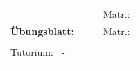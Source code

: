 \documentclass[a4paper,9pt, DIV15]{scrartcl} %
\newcommand{\LectureTitle}{}
\newcommand{\UBNR}{}
\newcommand{\AuthorOneName}{}
\newcommand{\AuthorOneMatr}{}
\newcommand{\AuthorTwoName}{}
\newcommand{\AuthorTwoMatr}{}
\newcommand{\TutorName}{}
\newcommand{\TutorTime}{}
\begin{document}
\begin{table}[h!]
\begin{tabular*}{\textwidth}{l p{5cm} ll}
\textbf{\LectureTitle} &  		&\AuthorOneName 		& Matr.: \AuthorOneMatr \\
\textbf{\"Ubungsblatt: \UBNR}  	&  		& 	\AuthorTwoName	& Matr.: \AuthorTwoMatr  \\
& & & \\[-5pt]
\multicolumn{2}{l}{ Tutorium: \TutorName $\ $ - \TutorTime }  \\
 & & & \\[-5pt]
\hline
\end{tabular*}
\end{table}
\end{document}
